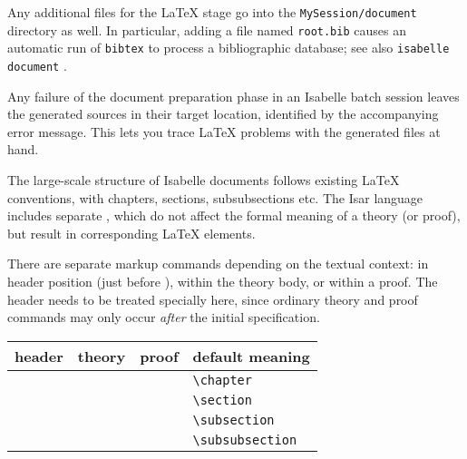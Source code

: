 \begin{isabellebody}
\begin{isamarkuptext}
  \medskip Any additional files for the {\LaTeX} stage go into the
  \texttt{MySession/document} directory as well.  In particular,
  adding a file named \texttt{root.bib} causes an automatic run of
  \texttt{bibtex} to process a bibliographic database; see also
  \texttt{isabelle document} \cite{isabelle-sys}.

  \medskip Any failure of the document preparation phase in an
  Isabelle batch session leaves the generated sources in their target
  location, identified by the accompanying error message.  This lets
  you trace {\LaTeX} problems with the generated files at hand.%
\end{isamarkuptext}%
\isamarkuptrue%
%
\isamarkuptrue%
%
\begin{isamarkuptext}%
The large-scale structure of Isabelle documents follows existing
  {\LaTeX} conventions, with chapters, sections, subsubsections etc.
  The Isar language includes separate , which
  do not affect the formal meaning of a theory (or proof), but result
  in corresponding {\LaTeX} elements.

  There are separate markup commands depending on the textual context:
  in header position (just before ), within the
  theory body, or within a proof.  The header needs to be treated
  specially here, since ordinary theory and proof commands may only
  occur \emph{after} the initial  specification.

  \medskip

  \begin{tabular}{llll}
  header & theory & proof & default meaning \\\hline
    & \commdx{chapter} & & \verb,\chapter, \\
  \commdx{header} & \commdx{section} & \commdx{sect} & \verb,\section, \\
    & \commdx{subsection} & \commdx{subsect} & \verb,\subsection, \\
    & \commdx{subsubsection} & \commdx{subsubsect} & \verb,\subsubsection, \\
  \end{tabular}


\end{isamarkuptext}
\end{isabellebody}
